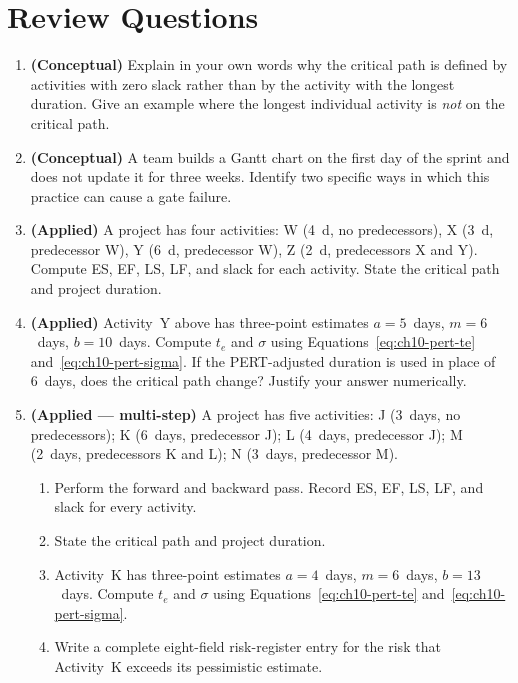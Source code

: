 \section*{Review Questions}


\begin{enumerate}
  \item \textbf{(Conceptual)} Explain in your own words why the critical
        path is defined by activities with zero slack rather than by the
        activity with the longest duration.
        Give an example where the longest individual activity is
        \emph{not} on the critical path.

  \item \textbf{(Conceptual)} A team builds a Gantt chart on the first
        day of the sprint and does not update it for three weeks.
        Identify two specific ways in which this practice can cause a
        gate failure.

  \item \textbf{(Applied)} A project has four activities:
        W (4~d, no predecessors), X (3~d, predecessor W),
        Y (6~d, predecessor W), Z (2~d, predecessors X and Y).
        Compute ES, EF, LS, LF, and slack for each activity.
        State the critical path and project duration.

  \item \textbf{(Applied)} Activity~Y above has three-point estimates
        $a = 5$~days, $m = 6$~days, $b = 10$~days.
        Compute $t_e$ and $\sigma$ using
        Equations~\ref{eq:ch10-pert-te} and~\ref{eq:ch10-pert-sigma}.
        If the PERT-adjusted duration is used in place of 6~days,
        does the critical path change?  Justify your answer numerically.

  \item \textbf{(Applied --- multi-step)} A project has five activities: J (3~days, no predecessors); K (6~days, predecessor J); L (4~days, predecessor J); M (2~days, predecessors K and L); N (3~days, predecessor M).
  \begin{enumerate}
    \item[(a)] Perform the forward and backward pass. Record ES, EF, LS, LF, and slack for every activity.
    \item[(b)] State the critical path and project duration.
    \item[(c)] Activity~K has three-point estimates $a = 4$~days, $m = 6$~days, $b = 13$~days. Compute $t_e$ and $\sigma$ using Equations~\ref{eq:ch10-pert-te} and~\ref{eq:ch10-pert-sigma}.
    \item[(d)] Write a complete eight-field risk-register entry for the risk that Activity~K exceeds its pessimistic estimate.
  \end{enumerate}
\end{enumerate}

